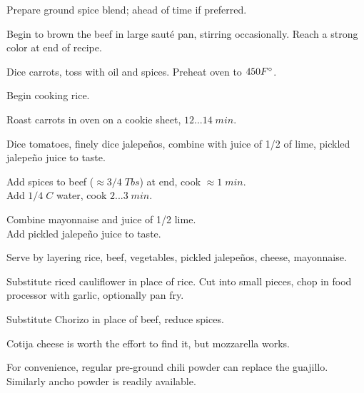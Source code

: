 
\begin{preparation}
\item Prepare ground spice blend; ahead of time if preferred.

\item Begin to brown the beef in large saut\'{e} pan, stirring occasionally. Reach a strong color at end of recipe.

\item Dice carrots, toss with oil and spices. Preheat oven to $450 F^\circ$.

\item Begin cooking rice.

\item Roast carrots in oven on a cookie sheet, $12...14\;min$.

\item Dice tomatoes, finely dice jalepe\~{n}os, combine with juice of 1/2 of lime, pickled jalepe\~{n}o juice to taste.

\item Add spices to beef ($\approx 3/4\; Tbs$) at end, cook $\approx1\; min$.\\Add $1/4\;C$ water, cook $2...3\;min$.

\item Combine mayonnaise and juice of 1/2 lime.\\Add pickled jalepe\~{n}o juice to taste.

\item Serve by layering rice, beef, vegetables, pickled jalepe\~{n}os, cheese, mayonnaise.
\end{preparation}

\begin{variation}
\item Substitute riced cauliflower in place of rice. Cut into small pieces, chop in food processor with garlic, optionally pan fry.
\item Substitute Chorizo in place of beef, reduce spices.
\item Cotija cheese is worth the effort to find it, but mozzarella works.
\item For convenience, regular pre-ground chili powder can replace the guajillo. Similarly ancho powder is readily available.
\end{variation}

\recipeend
